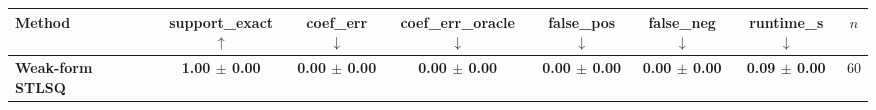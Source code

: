 \begin{tabular}{lccccccc}
\toprule
Method & support\_exact $\uparrow$ & coef\_err $\downarrow$ & coef\_err\_oracle $\downarrow$ & false\_pos $\downarrow$ & false\_neg $\downarrow$ & runtime\_s $\downarrow$ & $n$ \\
\midrule
\textbf{Weak-form STLSQ} & \textbf{1.00 $\pm$ 0.00} & \textbf{0.00 $\pm$ 0.00} & \textbf{0.00 $\pm$ 0.00} & \textbf{0.00 $\pm$ 0.00} & \textbf{0.00 $\pm$ 0.00} & \textbf{0.09 $\pm$ 0.00} & 60 \\
\bottomrule
\end{tabular}

